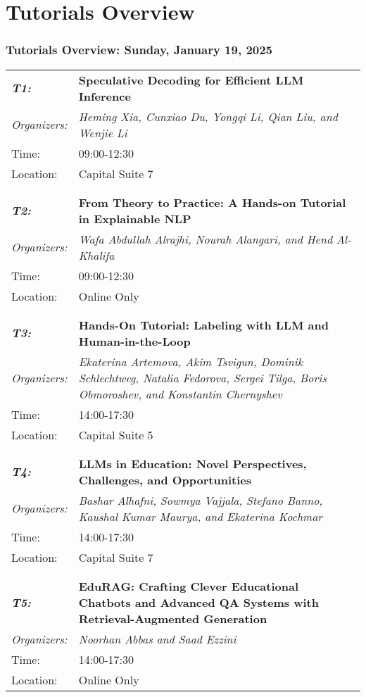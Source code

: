 \chapter{Tutorials Overview}
\subsection{Tutorials Overview: Sunday, January 19, 2025}
\begin{longtable}{p{15mm}p{100mm}}
\emph{\textbf{T1:}} & \textbf{Speculative Decoding for Efficient LLM Inference} \\
\emph{Organizers:} & \emph{Heming Xia, Cunxiao Du, Yongqi Li, Qian Liu, and Wenjie Li} \\
Time: & 09:00-12:30 \\
Location: & Capital Suite 7 \\\\
\hline\\
\emph{\textbf{T2:}} & \textbf{From Theory to Practice: A Hands-on Tutorial in Explainable NLP} \\
\emph{Organizers:} & \emph{Wafa Abdullah Alrajhi, Nourah Alangari, and Hend Al-Khalifa} \\
Time: & 09:00-12:30 \\
Location: & Online Only \\\\
\hline\\
\emph{\textbf{T3:}} & \textbf{Hands-On Tutorial: Labeling with LLM and Human-in-the-Loop} \\
\emph{Organizers:} & \emph{Ekaterina Artemova, Akim Tsvigun, Dominik Schlechtweg, Natalia Fedorova, Sergei Tilga, Boris Obmoroshev, and Konstantin Chernyshev} \\
Time: & 14:00-17:30 \\
Location: & Capital Suite 5 \\\\
\hline\\
\emph{\textbf{T4:}} & \textbf{LLMs in Education: Novel Perspectives, Challenges, and Opportunities} \\
\emph{Organizers:} & \emph{Bashar Alhafni, Sowmya Vajjala, Stefano Banno, Kaushal Kumar Maurya, and Ekaterina Kochmar} \\
Time: & 14:00-17:30 \\
Location: & Capital Suite 7 \\\\
\hline\\
\emph{\textbf{T5:}} & \textbf{EduRAG: Crafting Clever Educational Chatbots and Advanced QA Systems with Retrieval-Augmented Generation} \\
\emph{Organizers:} & \emph{Noorhan Abbas and Saad Ezzini} \\
Time: & 14:00-17:30 \\
Location: & Online Only \\
\end{longtable}

